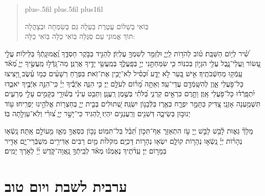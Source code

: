 \documentclass[twoside, openany, parskip=half, 11pt]{book}
\begin{document}
\begin{quote}
		\leftskip=0pt plus-.5fil
		\rightskip=0pt plus.5fil
		\parfillskip=0pt plus1fil

 בּֽוֹאִי בְשָׁלוֹם עֲטֶרֶת בַּעְלָהּ \hfill
גַּם בְּשִׂמְחָה וּבְצָהֳלָה \\
תּוֹךְ אֱמוּנֵי עַם סְגֻּלָּה \hfill
בּֽוֹאִי כַלָּה בּֽוֹאִי כַלָּה:

\lechadodi

\end{quote}

 
שִׁ֝֗יר לְי֥וֹם הַשַּׁבָּֽת׃
ט֗וֹב לְהֹד֥וֹת לַֽיְיָ֑ וּלְזַמֵּ֖ר לְשִׁמְךָ֣ עֶלְיֽוֹן׃ 
לְהַגִּ֣יד בַּבֹּ֣קֶר חַסְדֶּ֑ךָ וֶֽ֝אֱמוּנָֽתְֿךָ֗ בַּלֵּילֽוֹת׃ 
עֲלֵ֣י עָ֭שׂוֹר וַֽעֲלֵי־נָ֑בֶל עֲלֵ֖י הִגָּי֣וֹן בְּכִנּֽוֹר׃ 
כִּ֤י שִׂמַּחְתַּ֣נִי יְיָ֣ בְּפָֽעֳלֶ֑ךָ בְּמַֽעֲשֵׂ֖י יָדֶ֣יךָ אֲרַנֵּֽן׃ 
מַה־גָּֽדְֿל֣וּ מַֽעֲשֶׂ֣יךָ יְיָ֑ מְ֝אֹ֗ד עָֽמְֿק֥וּ מַחְשְֿׁבֹתֶֽיךָ׃ 
אִ֣ישׁ בַּ֭עַר לֹ֣א יֵדָ֑ע וּ֝כְסִ֗יל לֹֽא־יָבִ֥ין אֶת־זֹֽאת׃ 
בִּפְרֹ֤חַ רְשָׁעִ֨ים כְּמ֥וֹ עֵ֗שֶׂב וַ֭יָּצִיצוּ כָּל־פֹּ֣עֲלֵי אָ֑וֶן לְהִשָּֽׁמְֿדָ֥ם עֲדֵי־עַֽד׃ 
וְאַתָּ֥ה מָ֝ר֗וֹם לְעֹלָ֥ם יְיָ׃ 
כִּ֤י הִנֵּ֢ה אֹֽיְֿבֶ֡יךָ יְיָ֗ כִּֽי־ֹהִנֵּ֣ה אֹֽיְֿבֶ֣יךָ יֹאבֵ֑דוּ יִ֝תְפָּֽרְֿד֗וּ כָּל־פֹּ֥עֲלֵי אָֽוֶן׃ 
וַתָּ֣רֶם כִּרְאֵ֣ים קַרְנִ֑י בַּ֝לֹּתִ֗י בְּשֶׁ֣מֶן רַֽעֲנָֽן׃ 
וַתַּבֵּ֥ט עֵינִ֗י בְּשׁ֫וּרָ֥י בַּקָּמִ֣ים עָלַ֣י מְרֵעִ֑ים תִּשְׁמַ֥עְנָה אָזְנָֽי׃ 
 צַ֭דִּיק כַּתָּמָ֣ר יִפְרָ֑ח כְּאֶ֖רֶז בַּלְּֿבָנ֣וֹן יִשְׂגֶּֽה׃ 
שְׁ֭תוּלִים בְּבֵ֣ית יְיָ֑ בְּחַצְר֖וֹת אֱלֹהֵ֣ינוּ יַפְרִֽיחוּ׃ 
ע֖וֹד יְנוּב֣וּן בְּשֵׂיבָ֑ה דְּשֵׁנִ֖ים וְרַֽעֲנַנִּ֣ים יִהְיֽוּ׃ 
לְ֭הַגִּיד כִּי־יָשָׁ֣ר יְיָ֑ צ֝וּרִ֗י וְלֹֽא־עַוְלָ֥תָה בּֽוֹ׃

\clearpage
 מָלָךְ֘ גֵּא֢וּת לָ֫בֵ֥שׁ לָבֵ֣שׁ יְ֖יָ עֹ֣ז הִתְאַזָּר֑ אַף־תִּכּ֣וֹן תֵּ֝בֵ֗ל בַּל־תִּמּֽוֹט׃
נָכ֣וֹן כִּסְאֲךָ֣ מֵאָ֑ז מֵ֖עוֹלָ֣ם אָֽתָּה׃ 
נָֽשְֿׂא֤וּ נְהָר֨וֹת יְיָ֗ נָֽשְֿׂא֣וּ נְהָר֣וֹת קוֹלָ֑ם יִשְׂא֖וּ נְהָר֣וֹת דָּכְיָֽם׃
  מִקֹּלוֹ֨ת מַ֤יִם רַבִּים אַדִּירִ֥ים מִשְׁבְּֿרֵי־יָ֑ם אַדִּ֖יר בַּמָּר֣וֹם יְיָ׃ 
עֵֽדֹ֨תֶיךָ נֶאֶמְנ֬וּ מְאֹ֗ד לְבֵֽיתְֿךָ֥ נָֽאֲוָה־קֹּ֑דֶשׁ יְ֜יָ֗ לְאֹ֣רֶךְ יָמִֽים׃

\mournerskaddish

\vspace{\baselineskip}

{\let\clearpage\relax 
\chapter[ערבית לשבת ויום טוב]{ ערבית לשבת ויום טוב }}

\barachu

\hamaarivaravim
\end{document}
